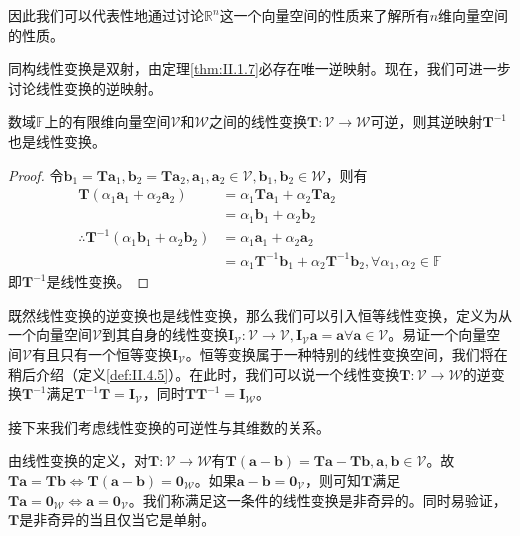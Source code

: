 \documentclass[main.tex]{subfiles}
\begin{document}
因此我们可以代表性地通过讨论$\mathbb{R}^n$这一个向量空间的性质来了解所有$n$维向量空间的性质。

同构线性变换是双射，由定理\ref{thm:II.1.7}必存在唯一逆映射。现在，我们可进一步讨论线性变换的逆映射。

\begin{theorem}
数域$\mathbb{F}$上的有限维向量空间$\mathcal{V}$和$\mathcal{W}$之间的线性变换$\mathbf{T}:\mathcal{V}\rightarrow\mathcal{W}$可逆，则其逆映射$\mathbf{T}^{-1}$也是线性变换。
\end{theorem}
\begin{proof}
令$\mathbf{b}_1=\mathbf{Ta}_1,\mathbf{b}_2=\mathbf{Ta}_2,\mathbf{a}_1,\mathbf{a}_2\in\mathcal{V},\mathbf{b}_1,\mathbf{b}_2\in\mathcal{W}$，则有
\begin{align*}
    \mathbf{T}\left(\alpha_1\mathbf{a}_1+\alpha_2\mathbf{a}_2\right)&=\alpha_1\mathbf{Ta}_1+\alpha_2\mathbf{Ta}_2\\
    &=\alpha_1\mathbf{b}_1+\alpha_2\mathbf{b}_2\\
    \therefore\mathbf{T}^{-1}\left(\alpha_1\mathbf{b}_1+\alpha_2\mathbf{b}_2\right)&=\alpha_1\mathbf{a}_1+\alpha_2\mathbf{a}_2\\
    &=\alpha_1\mathbf{T}^{-1}\mathbf{b}_1+\alpha_2\mathbf{T}^{-1}\mathbf{b}_2,\forall\alpha_1,\alpha_2\in\mathbb{F}
\end{align*}
即$\mathbf{T}^{-1}$是线性变换。
\end{proof}

既然线性变换的逆变换也是线性变换，那么我们可以引入恒等线性变换，定义为从一个向量空间$\mathcal{V}$到其自身的线性变换$\mathbf{I}_\mathcal{V}:\mathcal{V}\rightarrow\mathcal{V},\mathbf{I}_\mathcal{V}\mathbf{a}=\mathbf{a}\forall\mathbf{a}\in\mathcal{V}$。易证一个向量空间$\mathcal{V}$有且只有一个恒等变换$\mathbf{I}_\mathcal{V}$。恒等变换属于一种特别的线性变换空间，我们将在稍后介绍（定义\ref{def:II.4.5}）。在此时，我们可以说一个线性变换$\mathbf{T}:\mathcal{V}\rightarrow\mathcal{W}$的逆变换$\mathbf{T}^{-1}$满足$\mathbf{T}^{-1}\mathbf{T}=\mathbf{I}_\mathcal{V}$，同时$\mathbf{TT}^{-1}=\mathbf{I}_\mathcal{W}$。

接下来我们考虑线性变换的可逆性与其维数的关系。

由线性变换的定义，对$\mathbf{T}:\mathcal{V}\rightarrow\mathcal{W}$有$\mathbf{T}\left(\mathbf{a}-\mathbf{b}\right)=\mathbf{Ta}-\mathbf{Tb},\mathbf{a},\mathbf{b}\in\mathcal{V}$。故$\mathbf{Ta}=\mathbf{Tb}\Leftrightarrow\mathbf{T}\left(\mathbf{a}-\mathbf{b}\right)=\mathbf{0}_\mathcal{W}$。如果$\mathbf{a}-\mathbf{b}=\mathbf{0}_\mathcal{V}$，则可知$\mathbf{T}$满足$\mathbf{Ta}=\mathbf{0}_\mathcal{W}\Leftrightarrow\mathbf{a}=\mathbf{0}_\mathcal{V}$。我们称满足这一条件的线性变换是非奇异的。同时易验证，$\mathbf{T}$是非奇异的当且仅当它是单射。
\end{document}
